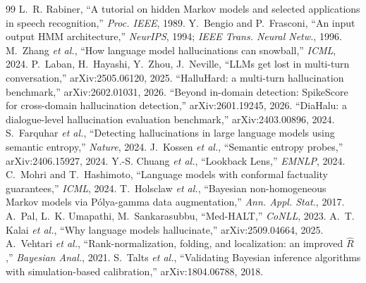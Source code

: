 \documentclass[conference]{IEEEtran}
\begin{document}
\begin{thebibliography}{99}\footnotesize
{} L.~R. Rabiner, ``A tutorial on hidden Markov models and selected applications in speech recognition,'' \emph{Proc. IEEE}, 1989.
 Y.~Bengio and P.~Frasconi, ``An input output HMM architecture,'' \emph{NeurIPS}, 1994; \emph{IEEE Trans. Neural Netw.}, 1996.
 M.~Zhang \emph{et al.}, ``How language model hallucinations can snowball,'' \emph{ICML}, 2024.
 P.~Laban, H.~Hayashi, Y.~Zhou, J.~Neville, ``LLMs get lost in multi-turn conversation,'' arXiv:2505.06120, 2025.
 ``HalluHard: a multi-turn hallucination benchmark,'' arXiv:2602.01031, 2026.
 ``Beyond in-domain detection: SpikeScore for cross-domain hallucination detection,'' arXiv:2601.19245, 2026.
 ``DiaHalu: a dialogue-level hallucination evaluation benchmark,'' arXiv:2403.00896, 2024.
 S.~Farquhar \emph{et al.}, ``Detecting hallucinations in large language models using semantic entropy,'' \emph{Nature}, 2024.
 J.~Kossen \emph{et al.}, ``Semantic entropy probes,'' arXiv:2406.15927, 2024.
 Y.-S. Chuang \emph{et al.}, ``Lookback Lens,'' \emph{EMNLP}, 2024.
 C.~Mohri and T.~Hashimoto, ``Language models with conformal factuality guarantees,'' \emph{ICML}, 2024.
 T.~Holsclaw \emph{et al.}, ``Bayesian non-homogeneous Markov models via P\'olya-gamma data augmentation,'' \emph{Ann. Appl. Stat.}, 2017.
 A.~Pal, L.~K. Umapathi, M.~Sankarasubbu, ``Med-HALT,'' \emph{CoNLL}, 2023.
 A.~T. Kalai \emph{et al.}, ``Why language models hallucinate,'' arXiv:2509.04664, 2025.
 A.~Vehtari \emph{et al.}, ``Rank-normalization, folding, and localization: an improved $\widehat R$,'' \emph{Bayesian Anal.}, 2021.
 S.~Talts \emph{et al.}, ``Validating Bayesian inference algorithms with simulation-based calibration,'' arXiv:1804.06788, 2018.
\end{thebibliography}
\end{document}
